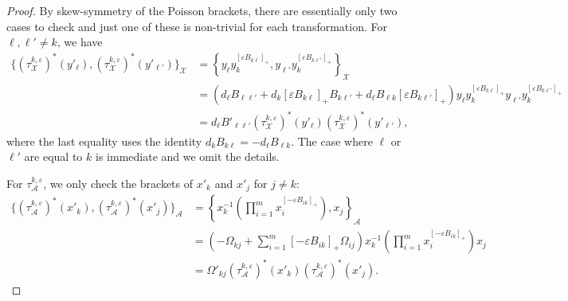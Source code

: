 \documentclass{amsart}
\numberwithin{equation}{section}
\newcommand{\cA}{\mathcal{A}}
\newcommand{\cX}{\mathcal{X}}
\begin{document}
\begin{proof}
  By skew-symmetry of the Poisson brackets, there are essentially only two cases to check and just one of these is non-trivial for each transformation.
  For $\ell,\ell'\ne k$, we have
  \begin{align*}
    \{(\tau_\cX^{k,\varepsilon})^*(y'_\ell),(\tau_\cX^{k,\varepsilon})^*(y'_{\ell'})\}_\cX
    &=\left\{y_\ell y_k^{[\varepsilon B_{k\ell}]_+},y_{\ell'} y_k^{[\varepsilon B_{k\ell'}]_+}\right\}_\cX\\
    &=(d_\ell B_{\ell\ell'}+d_k[\varepsilon B_{k\ell}]_+B_{k\ell'}+d_\ell B_{\ell k}[\varepsilon B_{k\ell'}]_+) y_\ell y_k^{[\varepsilon B_{k\ell}]_+} y_{\ell'} y_k^{[\varepsilon B_{k\ell'}]_+}\\
    &=d_\ell B'_{\ell\ell'} (\tau_\cX^{k,\varepsilon})^*(y'_\ell) (\tau_\cX^{k,\varepsilon})^*(y'_{\ell'}),
  \end{align*}
  where the last equality uses the identity $d_kB_{k\ell}=-d_\ell B_{\ell k}$.
  The case where $\ell$ or $\ell'$ are equal to $k$ is immediate and we omit the details.

  For $\tau_\cA^{k,\varepsilon}$, we only check the brackets of $x'_k$ and $x'_j$ for $j\ne k$:
  \begin{align*}
    \{(\tau_\cA^{k,\varepsilon})^*(x'_k),(\tau_\cA^{k,\varepsilon})^*(x'_j)\}_\cA
    &=\left\{x_k^{-1}\left(\prod\limits_{i=1}^m x_i^{[-\varepsilon B_{ik}]_+}\right),x_j\right\}_\cA\\
    &=\left(-\Omega_{kj}+\sum_{i=1}^m [-\varepsilon B_{ik}]_+\Omega_{ij}\right)x_k^{-1}\left(\prod\limits_{i=1}^m x_i^{[-\varepsilon B_{ik}]_+}\right)x_j\\
    &=\Omega'_{kj} (\tau_\cA^{k,\varepsilon})^*(x'_k) (\tau_\cA^{k,\varepsilon})^*(x'_j).
  \end{align*}
\end{proof}
\end{document}

